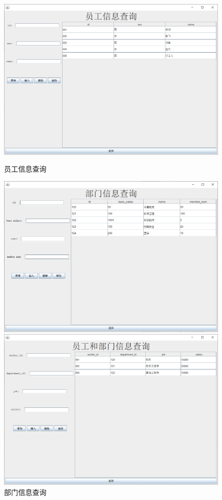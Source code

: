 \documentclass[withoutpreface,bwprint]{cumcmthesis} %
\begin{document}
\begin{figure}[H]
	\centering
	\begin{minipage}[t]{0.49\linewidth}
		\centering
		\includegraphics[width=1\linewidth]{worker}
		\caption{员工信息查询}
	\end{minipage}
	\begin{minipage}[t]{0.49\linewidth}
		\centering
		\includegraphics[width=1\linewidth]{department}
		\caption{部门信息查询}
	\end{minipage}
	\begin{minipage}[t]{0.49\linewidth}
		\centering
		\includegraphics[width=1\linewidth]{management}

\end{minipage}
\end{figure}
\end{document}
